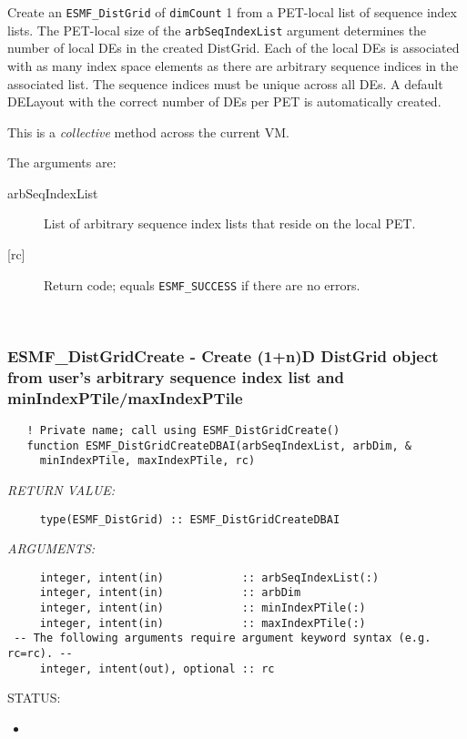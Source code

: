        Create an {\tt ESMF\_DistGrid} of {\tt dimCount} 1 from a PET-local list
       of sequence index lists. The PET-local size of the {\tt arbSeqIndexList}
       argument determines the number of local DEs in the created DistGrid.
       Each of the local DEs is associated with as many index space elements as
       there are arbitrary sequence indices in the associated list.
       The sequence indices must be unique across all DEs. A default
       DELayout with the correct number of DEs per PET is automatically created.
  
       This is a {\em collective} method across the current VM.
  
       The arguments are:
       \begin{description}
       \item[arbSeqIndexList]
            List of arbitrary sequence index lists that reside on the local PET.
       \item[{[rc]}]
            Return code; equals {\tt ESMF\_SUCCESS} if there are no errors.
       \end{description}
   
 
\mbox{}\hrulefill\ 
 
\subsubsection [ESMF\_DistGridCreate] {ESMF\_DistGridCreate - Create (1+n)D DistGrid object from user's arbitrary sequence index list and minIndexPTile/maxIndexPTile}


 
\begin{verbatim}   ! Private name; call using ESMF_DistGridCreate()
   function ESMF_DistGridCreateDBAI(arbSeqIndexList, arbDim, &
     minIndexPTile, maxIndexPTile, rc)
           \end{verbatim}{\em RETURN VALUE:}
\begin{verbatim}     type(ESMF_DistGrid) :: ESMF_DistGridCreateDBAI\end{verbatim}{\em ARGUMENTS:}
\begin{verbatim}     integer, intent(in)            :: arbSeqIndexList(:)
     integer, intent(in)            :: arbDim
     integer, intent(in)            :: minIndexPTile(:)
     integer, intent(in)            :: maxIndexPTile(:)
 -- The following arguments require argument keyword syntax (e.g. rc=rc). --
     integer, intent(out), optional :: rc\end{verbatim}
{\sf STATUS:}
   \begin{itemize}
   \item{}
   \end{itemize}
  

